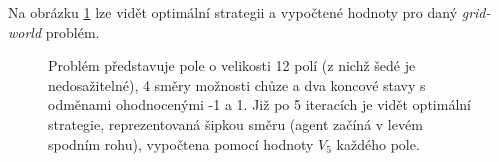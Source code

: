 Na obrázku \ref{img:policy} lze vidět optimální strategii a vypočtené hodnoty pro daný \textit{grid-world} problém.

\begin{figure}[!htbp]
\begin{center}
	\caption{Problém představuje pole o velikosti 12 polí (z nichž šedé je nedosažitelné), 4 směry možnosti chůze a dva koncové stavy s odměnami ohodnocenými -1 a 1. Již po 5 iteracích je vidět optimální strategie, reprezentovaná šipkou směru (agent začíná v levém spodním rohu), vypočtena pomocí hodnoty $V_{5}$ každého pole.}
	\label{img:policy}
\end{center}
\end{figure}

